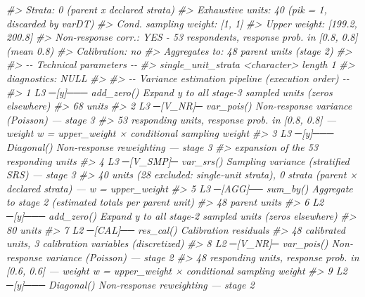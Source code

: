 \documentclass[
]{article}
\newenvironment{Shaded}{\begin{snugshade}}{\end{snugshade}}
\newcommand{\CommentTok}[1]{\textcolor[rgb]{0.56,0.35,0.01}{\textit{#1}}}
\begin{document}
\begin{Shaded}
\begin{Highlighting}[]
\CommentTok{\#\textgreater{}     Strata:                0  (parent x declared strata)}
\CommentTok{\#\textgreater{}     Exhaustive units:      40 (pik = 1, discarded by varDT)}
\CommentTok{\#\textgreater{}     Cond. sampling weight: [1, 1]}
\CommentTok{\#\textgreater{}     Upper weight:    [199.2, 200.8]}
\CommentTok{\#\textgreater{}     Non{-}response corr.:     YES {-} 53 respondents, response prob. in [0.8, 0.8] (mean 0.8)}
\CommentTok{\#\textgreater{}     Calibration:            no}
\CommentTok{\#\textgreater{}     Aggregates to:          48 parent units (stage 2)}
\CommentTok{\#\textgreater{} }
\CommentTok{\#\textgreater{} {-}{-} Technical parameters {-}{-}}
\CommentTok{\#\textgreater{}   single\_unit\_strata \textless{}character\textgreater{} length 1}
\CommentTok{\#\textgreater{}   diagnostics: NULL}
\CommentTok{\#\textgreater{} }
\CommentTok{\#\textgreater{} {-}{-} Variance estimation pipeline (execution order) {-}{-}}
\CommentTok{\#\textgreater{}    1 L3 ─[y]─── add\_zero()  Expand y to all stage{-}3 sampled units (zeros elsewhere)}
\CommentTok{\#\textgreater{}            68 units}
\CommentTok{\#\textgreater{}    2 L3 ─[V\_NR]─ var\_pois()  Non{-}response variance (Poisson) — stage 3}
\CommentTok{\#\textgreater{}            53 responding units, response prob. in [0.8, 0.8] — weight w = upper\_weight × conditional sampling weight}
\CommentTok{\#\textgreater{}    3 L3 ─[y]─── Diagonal()  Non{-}response reweighting — stage 3}
\CommentTok{\#\textgreater{}            expansion of the 53 responding units}
\CommentTok{\#\textgreater{}    4 L3 ─[V\_SMP]─ var\_srs()  Sampling variance (stratified SRS) — stage 3}
\CommentTok{\#\textgreater{}            40 units (28 excluded: single{-}unit strata), 0 strata (parent × declared strata) — w = upper\_weight}
\CommentTok{\#\textgreater{}    5 L3 ─[AGG]── sum\_by()  Aggregate to stage 2 (estimated totals per parent unit)}
\CommentTok{\#\textgreater{}            48 parent units}
\CommentTok{\#\textgreater{}    6 L2 ─[y]─── add\_zero()  Expand y to all stage{-}2 sampled units (zeros elsewhere)}
\CommentTok{\#\textgreater{}            80 units}
\CommentTok{\#\textgreater{}    7 L2 ─[CAL]── res\_cal()  Calibration residuals}
\CommentTok{\#\textgreater{}            48 calibrated units, 3 calibration variables (discretized)}
\CommentTok{\#\textgreater{}    8 L2 ─[V\_NR]─ var\_pois()  Non{-}response variance (Poisson) — stage 2}
\CommentTok{\#\textgreater{}            48 responding units, response prob. in [0.6, 0.6] — weight w = upper\_weight × conditional sampling weight}
\CommentTok{\#\textgreater{}    9 L2 ─[y]─── Diagonal()  Non{-}response reweighting — stage 2}

\end{Highlighting}
\end{Shaded}
\end{document}
